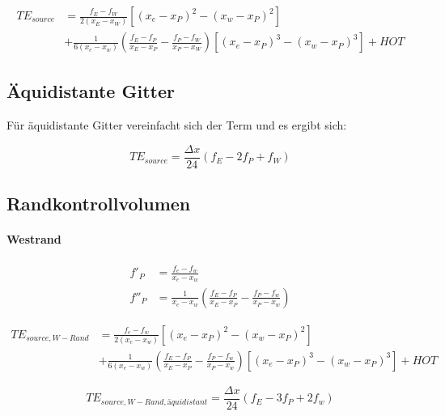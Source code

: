 \documentclass[11pt, ngerman,colorback,accentcolor=tud2d]{tudreport}
\begin{document}
\begin{align}
  TE_{source} &=
 \frac{f_E-f_W}{2(x_E-x_W)}  \left[{(x_e-x_P)^2-(x_w-x_P)^2}\right]\nonumber\\
&+\frac{1}{6(x_e-x_w)}\left(\frac{f_E-f_P}{x_E-x_P}-\frac{f_P-f_W}{x_P-x_W}\right)
  \left[{{(x_e-x_P)}^3-{(x_w-x_P)}^3}\right] + HOT
\end{align}

\subsection{Äquidistante Gitter}

Für äquidistante Gitter vereinfacht sich der Term und es ergibt sich:

\begin{equation*}
  TE_{source} = \frac{\Delta x}{24} \left({f_E-2f_P+f_W}\right)
\end{equation*}

\subsection{Randkontrollvolumen}

\paragraph{Westrand}



\begin{align*}
  f'_P &=\frac{f_e-f_w}{x_e-x_w}\\
  f''_P &= \frac{1}{x_e-x_w}\left(\frac{f_E-f_P}{x_E-x_P}-\frac{f_P-f_w}{x_P-x_w}\right)
\end{align*}

\begin{align}
  TE_{source, W-Rand} &=
 \frac{f_e-f_w}{2(x_e-x_w)}  \left[{(x_e-x_P)^2-(x_w-x_P)^2}\right]\nonumber\\
&+\frac{1}{6(x_e-x_w)}\left(\frac{f_E-f_P}{x_E-x_P}-\frac{f_P-f_w}{x_P-x_w}\right)
  \left[{{(x_e-x_P)}^3-{(x_w-x_P)}^3}\right] + HOT
\end{align}

\begin{equation*}
  TE_{source, W-Rand, äquidistant} = \frac{\Delta x}{24} \left({f_E-3f_P+2f_w}\right)
\end{equation*}
\end{document}
